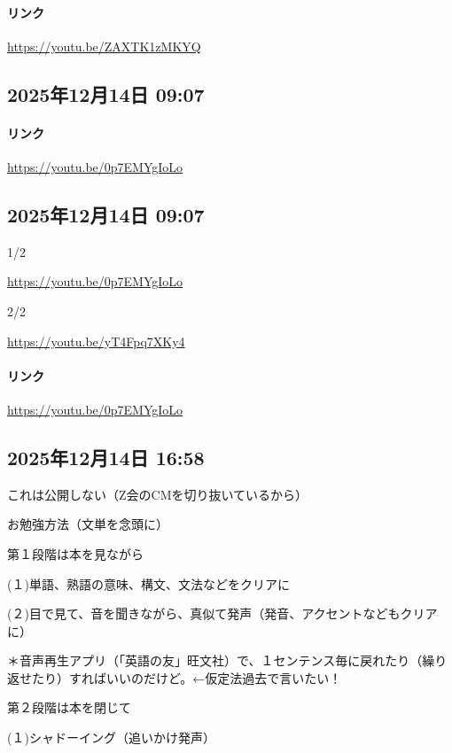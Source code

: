 \paragraph{リンク}
\url{https://youtu.be/ZAXTK1zMKYQ}

\subsection*{2025年12月14日 09:07}

\paragraph{リンク}
\url{https://youtu.be/0p7EMYgIoLo}

\subsection*{2025年12月14日 09:07}

1/2

\url{https://youtu.be/0p7EMYgIoLo}

2/2

\url{https://youtu.be/yT4Fpq7XKy4}

\paragraph{リンク}
\url{https://youtu.be/0p7EMYgIoLo}

\subsection*{2025年12月14日 16:58}

これは公開しない（Z会のCMを切り抜いているから）

お勉強方法（文単を念頭に）

第１段階は本を見ながら

(１)単語、熟語の意味、構文、文法などをクリアに

(２)目で見て、音を聞きながら、真似て発声（発音、アクセントなどもクリアに）

＊音声再生アプリ（「英語の友」旺文社）で、１センテンス毎に戻れたり（繰り返せたり）すればいいのだけど。←仮定法過去で言いたい！

第２段階は本を閉じて

(１)シャドーイング（追いかけ発声）

